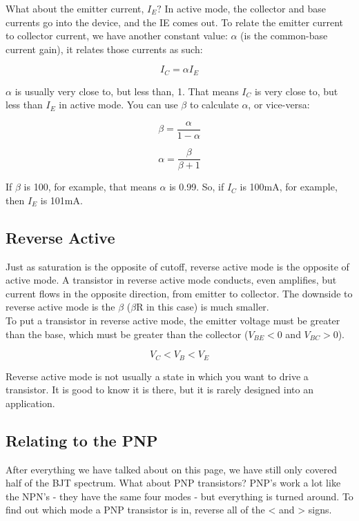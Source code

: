 \documentclass[a4paper, 11pt]{article} %
\begin{document}
What about the emitter current, $I_{E}?$ In active mode, the collector and base currents go into the device, and the IE comes out. To relate the emitter current to collector current, we have another constant value: $\alpha$ (is the common-base current gain), it relates those currents as such:

$$I_{C} = \alpha I_{E}$$

$\alpha$ is usually very close to, but less than, 1. That means $I_{C}$ is very close to, but less than $I_{E}$ in active mode. You can use $\beta$ to calculate $\alpha$, or vice-versa:

$$ \beta = \frac{\alpha}{1-\alpha}$$

$$ \alpha = \frac{\beta}{\beta +1}$$

If $\beta$ is 100, for example, that means $\alpha$ is 0.99. So, if $I_{C}$ is 100mA, for example, then $I_{E}$ is 101mA.

\subsection*{Reverse Active}

Just as saturation is the opposite of cutoff, reverse active mode is the opposite of active mode. A transistor in reverse active mode conducts, even amplifies, but current flows in the opposite direction, from emitter to collector. The downside to reverse active mode is the $\beta$ ($\beta$R in this case) is much smaller.\\

To put a transistor in reverse active mode, the emitter voltage must be greater than the base, which must be greater than the collector ($V_{BE}<0$ and $V_{BC}>0$).

$$ V_{C} < V_{B} < V_{E}$$

Reverse active mode is not usually a state in which you want to drive a transistor. It is good to know it is there, but it is rarely designed into an application.

\subsection*{Relating to the PNP}

After everything we have talked about on this page, we have still only covered half of the BJT spectrum. What about PNP transistors? PNP's work a lot like the NPN's - they have the same four modes - but everything is turned around. To find out which mode a PNP transistor is in, reverse all of the < and > signs.\\
\end{document}
